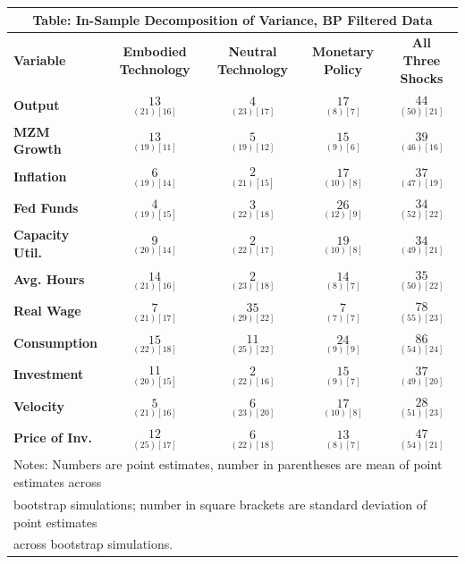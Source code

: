 \documentclass{article}
\begin{document}
 \begin{tabular}{|l|c|@{}c|c|@{}c|} 
 \hline 
 \multicolumn{5}{|c|}{\textbf{Table: In-Sample Decomposition of Variance, BP Filtered Data}} \\ \hline 
 \textbf{Variable} & \textbf{Embodied Technology} & \textbf{Neutral Technology} & \textbf{%
 Monetary Policy} & \textbf{All Three Shocks} \\ \hline\hline 
 \textbf{Output} & $\underset{( 21)[ 16]}{ 13}$ & $\underset{( 23)[ 17]}{  4}$ & $\underset{(  8)[  7]}{ 17}$ & $\underset{( 50)[ 21]}{ 44}$ \\ \hline 
 \textbf{MZM Growth} & $\underset{( 19)[ 11]}{ 13}$ & $\underset{( 19)[ 12]}{  5}$ & $\underset{(  9)[  6]}{ 15}$ & $\underset{( 46)[ 16]}{ 39}$ \\ \hline 
 \textbf{Inflation} & $\underset{( 19)[ 14]}{  6}$ & $\underset{( 21)[ 15]}{  2}$ & $\underset{( 10)[  8]}{ 17}$ & $\underset{( 47)[ 19]}{ 37}$ \\ \hline 
 \textbf{Fed Funds} & $\underset{( 19)[ 15]}{  4}$ & $\underset{( 22)[ 18]}{  3}$ & $\underset{( 12)[  9]}{ 26}$ & $\underset{( 52)[ 22]}{ 34}$ \\ \hline 
 \textbf{Capacity Util.} & $\underset{( 20)[ 14]}{  9}$ & $\underset{( 22)[ 17]}{  2}$ & $\underset{( 10)[  8]}{ 19}$ & $\underset{( 49)[ 21]}{ 34}$ \\ \hline 
 \textbf{Avg. Hours} & $\underset{( 21)[ 16]}{ 14}$ & $\underset{( 23)[ 18]}{  2}$ & $\underset{(  8)[  7]}{ 14}$ & $\underset{( 50)[ 22]}{ 35}$ \\ \hline 
 \textbf{Real Wage} & $\underset{( 21)[ 17]}{  7}$ & $\underset{( 29)[ 22]}{ 35}$ & $\underset{(  7)[  7]}{  7}$ & $\underset{( 55)[ 23]}{ 78}$ \\ \hline 
 \textbf{Consumption} & $\underset{( 22)[ 18]}{ 15}$ & $\underset{( 25)[ 22]}{ 11}$ & $\underset{(  9)[  9]}{ 24}$ & $\underset{( 54)[ 24]}{ 86}$ \\ \hline 
 \textbf{Investment} & $\underset{( 20)[ 15]}{ 11}$ & $\underset{( 22)[ 16]}{  2}$ & $\underset{(  9)[  7]}{ 15}$ & $\underset{( 49)[ 20]}{ 37}$ \\ \hline 
 \textbf{Velocity} & $\underset{( 21)[ 16]}{  5}$ & $\underset{( 23)[ 20]}{  6}$ & $\underset{( 10)[  8]}{ 17}$ & $\underset{( 51)[ 23]}{ 28}$ \\ \hline 
 \textbf{Price of Inv.} & $\underset{( 25)[ 17]}{ 12}$ & $\underset{( 22)[ 18]}{  6}  $ & $\underset{(  8)[  7]}{ 13}$ & $\underset{( 54)[ 21]}{ 47}$ \\ \hline 
 \multicolumn{5}{|l|}{Notes: Numbers are point estimates, number in 
 parentheses are mean of point estimates across} \\ \hline 
 \multicolumn{5}{|l|}{bootstrap simulations; number in square brackets are 
 standard deviation of point estimates} \\ \hline 
 \multicolumn{5}{|l|}{across bootstrap simulations.} \\ \hline 
 \end{tabular} 
\end{document}
